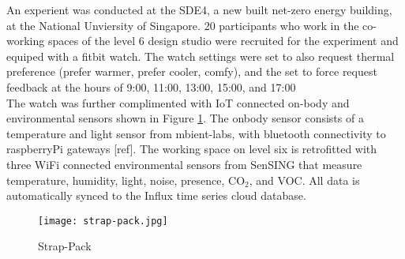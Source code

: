 
An experient was conducted at the SDE4, a new built net-zero energy building, at the National Unviersity of Singapore. 20 participants who work in the co-working spaces of the level 6 design studio were recruited for the experiment and equiped with a fitbit watch. The watch settings were set to also request thermal preference (prefer warmer, prefer cooler, comfy), and the set to force request feedback at the hours of 9:00, 11:00, 13:00, 15:00, and 17:00 \\

The watch was further complimented with IoT connected on-body and environmental sensors shown in Figure \ref{fig:strappack}. The onbody sensor consists of a temperature and light sensor from mbient-labs, with bluetooth connectivity to raspberryPi gateways [ref]. The working space on level six is retrofitted with three WiFi connected environmental sensors from SenSING that measure temperature, humidity, light, noise, presence, CO$_2$, and VOC. All data is automatically synced to the Influx time series cloud database.\\


\begin{figure}
\begin{center}
\texttt{[image: strap-pack.jpg]}
\caption{Strap-Pack}
\label{fig:strappack}
\end{center}
\end{figure}


